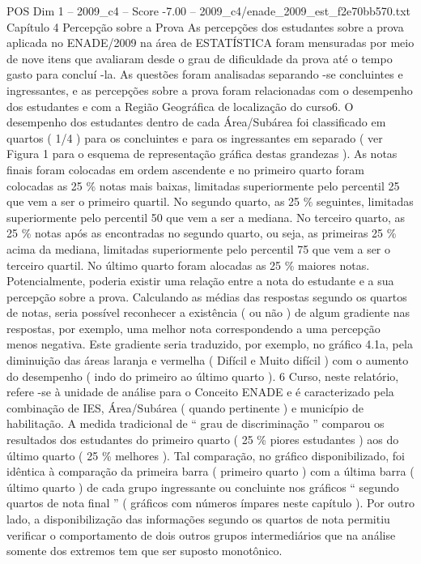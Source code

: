 \begin{textsample}{POS Dim 1 – 2009\_c4 – Score -7.00 – 2009\_c4/enade\_2009\_est\_f2e70bb570.txt}  \label{ex:f1_pos_418}
Capítulo 4 Percepção sobre a Prova As percepções dos estudantes sobre a prova aplicada no ENADE/2009 na área de ESTATÍSTICA foram mensuradas por meio de nove itens que avaliaram desde o grau de dificuldade da prova até o tempo gasto para concluí -la.
As questões foram analisadas separando -se concluintes e ingressantes, e as percepções sobre a prova foram relacionadas com o desempenho dos estudantes e com a Região Geográfica de localização do curso6.
O desempenho dos estudantes dentro de cada Área/Subárea foi classificado em quartos ( 1/4 ) para os concluintes e para os ingressantes em separado ( ver Figura 1 para o esquema de representação gráfica destas grandezas ).
As notas finais foram colocadas em ordem ascendente e no primeiro quarto foram colocadas as 25 \% notas mais baixas, limitadas superiormente pelo percentil 25 que vem a ser o primeiro quartil.
No segundo quarto, as 25 \% seguintes, limitadas superiormente pelo percentil 50 que vem a ser a mediana.
No terceiro quarto, as 25 \% notas após as encontradas no segundo quarto, ou seja, as primeiras 25 \% acima da mediana, limitadas superiormente pelo percentil 75 que vem a ser o terceiro quartil.
No último quarto foram alocadas as 25 \% maiores notas.
Potencialmente, poderia existir uma relação entre a nota do estudante e a sua percepção sobre a prova.
Calculando as médias das respostas segundo os quartos de notas, seria possível reconhecer a existência ( ou não ) de algum gradiente nas respostas, por exemplo, uma melhor nota correspondendo a uma percepção menos negativa.
Este gradiente seria traduzido, por exemplo, no gráfico 4.1a, pela diminuição das áreas laranja e vermelha ( Difícil e Muito difícil ) com o aumento do desempenho ( indo do primeiro ao último quarto ). 6 Curso, neste relatório, refere -se à unidade de análise para o Conceito ENADE e é caracterizado pela combinação de IES, Área/Subárea ( quando pertinente ) e município de habilitação.
A medida tradicional de “ grau de discriminação ” comparou os resultados dos estudantes do primeiro quarto ( 25 \% piores estudantes ) aos do último quarto ( 25 \% melhores ).
Tal comparação, no gráfico disponibilizado, foi idêntica à comparação da primeira barra ( primeiro quarto ) com a última barra ( último quarto ) de cada grupo ingressante ou concluinte nos gráficos “ segundo quartos de nota final ” ( gráficos com números ímpares neste capítulo ).
Por outro lado, a disponibilização das informações segundo os quartos de nota permitiu verificar o comportamento de dois outros grupos intermediários que na análise somente dos extremos tem que ser suposto monotônico.

\end{textsample}
